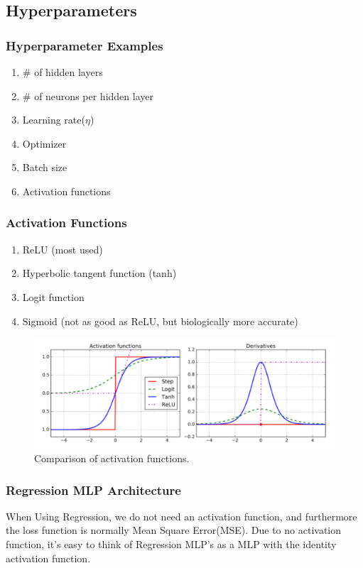 \documentclass[article]{llncs}
\begin{document}
\subsection{Hyperparameters}
\subsubsection{Hyperparameter Examples}
\begin{enumerate}
    \item $\#$ of hidden layers
    \item $\#$ of neurons per hidden layer
    \item Learning rate($\eta$)
    \item Optimizer
    \item Batch size
    \item Activation functions
\end{enumerate}

\subsubsection{Activation Functions}
\begin{enumerate}
    \item ReLU (most used)
    \item Hyperbolic tangent function (tanh)
    \item Logit function
    \item Sigmoid (not as good as ReLU, but biologically more accurate)
\end{enumerate}

\begin{figure}[H]
\centering
\includegraphics[scale=0.5]{fig6.PNG}
\caption{Comparison of activation functions.} \label{fig6}
\end{figure}

\subsubsection{Regression MLP Architecture}
When Using Regression, we do not need an activation function, and furthermore the loss function is normally Mean Square Error(MSE). Due to no activation function, it's easy to think of Regression MLP's as a MLP with the identity activation function.
\end{document}
